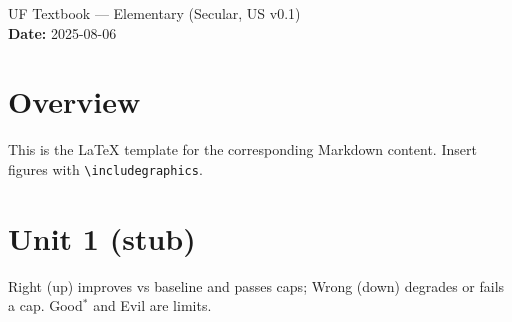 \documentclass[11pt]{article}
\begin{document}
\begin{center}
{\LARGE UF Textbook — Elementary (Secular, US v0.1) }\\[6pt]
\textbf{Date: }2025-08-06
\end{center}

\section*{Overview}
This is the LaTeX template for the corresponding Markdown content. Insert figures with \texttt{\textbackslash includegraphics}.

\section*{Unit 1 (stub)}
Right (up) improves vs baseline and passes caps; Wrong (down) degrades or fails a cap. Good$^\ast$ and Evil are limits.
\end{document}
